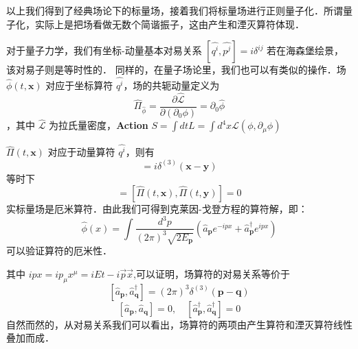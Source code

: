 \begin{corollary}{}
以上我们得到了经典场论下的标量场，接着我们将标量场进行正则量子化．所谓量子化，实际上是把场看做无数个简谐振子，这由产生和湮灭算符体现．

对于量子力学，我们有坐标-动量基本对易关系
$\left[\hat{q^{i}}, \hat{p^{j}}\right]=i \delta^{i j}$
若在海森堡绘景，该对易子则是等时性的．
同样的，在量子场论里，我们也可以有类似的操作．场 $\hat{\phi}(t, \mathbf{x})$ 对应于坐标算符 $\hat{q^{i}}$，场的共轭动量定义为\begin{equation}
\hat{\Pi}_{\hat{\phi}}=\frac{\partial \hat{\mathcal{L}}}{\partial\left(\partial_{0} \phi\right)}=\partial_{0} \hat{\phi}
\end{equation}，其中 $\hat{\mathcal{L}}$ 为拉氏量密度，\textbf{Action} $S=\int d t L=\int d^{4} x \mathcal{L}\left(\phi, \partial_{\mu} \phi\right)$

$\hat{\Pi}(t, \mathbf{x})$ 对应于动量算符 $\hat{q^{i}}$，则有
\begin{equation}
[\hat{\phi}(t, \mathbf{x}), \hat{\Pi}(t, \mathbf{y})]=i \delta^{(3)}(\mathbf{x}-\mathbf{y})
\end{equation}
等时下
\begin{equation}
[\hat{\phi}(t, \mathbf{x}), \hat{\phi}(t, \mathbf{y})]=[\hat{\Pi}(t, \mathbf{x}), \hat{\Pi}(t, \mathbf{y})]=0
\end{equation}
实标量场是厄米算符．由此我们可得到克莱因-戈登方程的算符解，即：
\begin{equation}
\hat{\phi}(x)=\int \frac{d^{3} p}{(2 \pi)^{3} \sqrt{2 E_{\mathbf{p}}}}\left(\hat{a}_{\mathbf{p}} e^{-i p x}+\hat{a}_{\mathbf{p}}^{\dagger} e^{i p x}\right)
\end{equation}
可以验证算符的厄米性．

其中 $ipx=ip_\mu x^\mu=iEt-i\vec{p}\vec{x}$,可以证明，场算符的对易关系等价于
\begin{equation}
\left[\hat{a}_{\mathbf{p}}, \hat{a}_{\mathbf{q}}^{\dagger}\right]=(2 \pi)^{3} \delta^{(3)}(\mathbf{p}-\mathbf{q})
\end{equation}
\begin{equation}
\left[\hat{a}_{\mathbf{p}}, \hat{a}_{\mathbf{q}}\right]=0, \quad\left[\hat{a}_{\mathbf{p}}^{\dagger}, \hat{a}_{\mathbf{q}}^{\dagger}\right]=0
\end{equation}
自然而然的，从对易关系我们可以看出，场算符的两项由产生算符和湮灭算符线性叠加而成．
\end{corollary}
